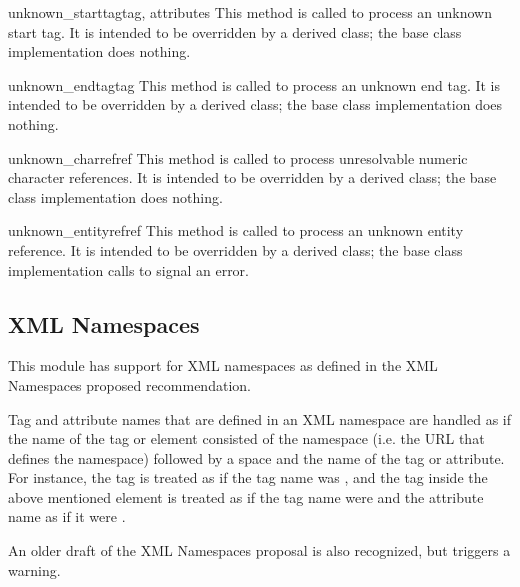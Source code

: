 \begin{methoddesc}{unknown_starttag}{tag, attributes}
This method is called to process an unknown start tag.  It is intended
to be overridden by a derived class; the base class implementation
does nothing.
\end{methoddesc}

\begin{methoddesc}{unknown_endtag}{tag}
This method is called to process an unknown end tag.  It is intended
to be overridden by a derived class; the base class implementation
does nothing.
\end{methoddesc}

\begin{methoddesc}{unknown_charref}{ref}
This method is called to process unresolvable numeric character
references.  It is intended to be overridden by a derived class; the
base class implementation does nothing.
\end{methoddesc}

\begin{methoddesc}{unknown_entityref}{ref}
This method is called to process an unknown entity reference.  It is
intended to be overridden by a derived class; the base class
implementation calls  to signal an error.
\end{methoddesc}


\begin{seealso}

\end{seealso}


\subsection{XML Namespaces \label{xml-namespace}}

This module has support for XML namespaces as defined in the XML
Namespaces proposed recommendation.

Tag and attribute names that are defined in an XML namespace are
handled as if the name of the tag or element consisted of the
namespace (i.e. the URL that defines the namespace) followed by a
space and the name of the tag or attribute.  For instance, the tag
 is treated as if 
the tag name was , and
the tag  inside the above
mentioned element is treated as if the tag name were
 and the attribute name as
if it were .

An older draft of the XML Namespaces proposal is also recognized, but
triggers a warning.
